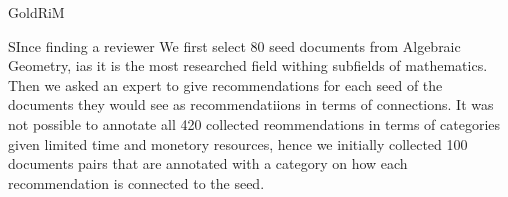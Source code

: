 GoldRiM

SInce finding a reviewer
We first select 80 seed documents from Algebraic Geometry, ias it is the most researched field withing subfields of mathematics.
Then we asked an expert to give recommendations for each seed of the documents they would see as recommendatiions in terms of connections.
It was not possible to annotate all 420 collected reommendations in terms of categories given limited time and monetory resources, hence we initially collected 100 documents pairs that are annotated with a category on how each recommendation is connected to the seed.